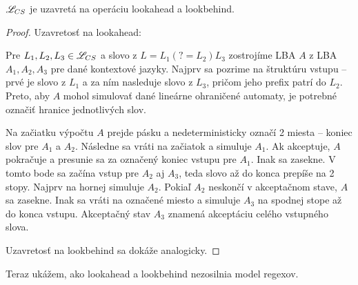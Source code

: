 \begin{veta} \label{CS-lookahead}
$ \mathscr{L}_{CS} $ je uzavretá na operáciu lookahead a lookbehind.
\end{veta} 
\begin{proof}
Uzavretosť na lookahead:

Pre $ L_{1}, L_{2}, L_{3} \in \mathscr{L}_{CS} $ a slovo z $ L = L_{1}(?=L_{2})L_{3} $ zostrojíme LBA $A$ z LBA $A_1, A_2, A_3$ pre dané kontextové jazyky. Najprv sa pozrime na štruktúru vstupu -- prvé je slovo z $L_1$ a za ním nasleduje slovo z $L_3$, pričom jeho prefix patrí do $L_2$. Preto, aby $A$ mohol simulovať dané lineárne ohraničené automaty, je potrebné označiť hranice jednotlivých slov.

 Na začiatku výpočtu $A$ prejde pásku a nedeterministicky označí 2 miesta -- koniec slov pre $A_1$ a $A_2$. Následne sa vráti na začiatok a simuluje $A_1$. Ak akceptuje, $A$ pokračuje a presunie sa za označený koniec vstupu pre $A_1$. Inak sa zasekne. V tomto bode sa začína vstup pre $A_2$ aj $A_3$, teda slovo až do konca prepíše na 2 stopy. Najprv na hornej simuluje $A_2$. Pokiaľ $A_2$ neskončí v akceptačnom stave, $A$ sa zasekne. Inak sa vráti na označené miesto a simuluje $A_3$ na spodnej stope až do konca vstupu. Akceptačný stav $A_3$ znamená akceptáciu celého vstupného slova.

Uzavretosť na lookbehind sa dokáže analogicky.
\end{proof}

Teraz ukážem, ako lookahead a lookbehind nezosilnia model regexov.

